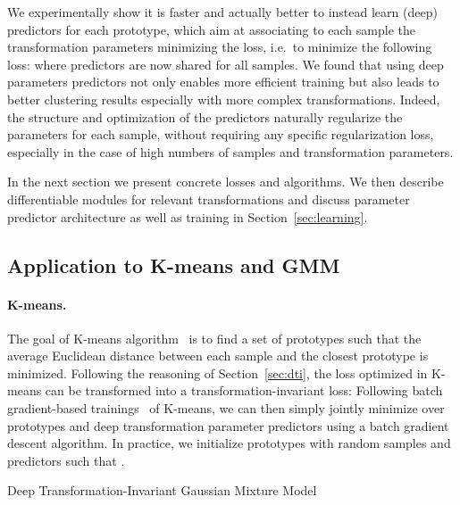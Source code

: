 \documentclass{article}
\begin{document}
\vspace{-0.3em}
We experimentally show it is faster and actually better to instead learn  (deep) 
predictors  for each prototype, which aim at associating to each sample  the 
transformation parameters  minimizing the loss, i.e.\ to minimize the following 
loss:
where predictors  are now shared for all samples. We found that using deep 
parameters predictors not only enables more efficient training but also leads to better 
clustering results especially with more complex transformations. Indeed, the structure and 
optimization of the predictors naturally regularize the parameters for each sample, without 
requiring any specific regularization loss, especially in the case of high numbers  of 
samples and transformation parameters.

\vspace{-0.3em}
In the next section we present concrete losses and algorithms. We then describe 
differentiable modules for relevant transformations and discuss parameter predictor 
architecture as well as training in Section~\ref{sec:learning}. 

\subsection{Application to K-means and GMM}

\paragraph{K-means.}
The goal of K-means algorithm~\cite{macqueenMethodsClassificationAnalysis1967} is to find a 
set of prototypes  such that the average Euclidean distance between each sample and 
the closest prototype is minimized. Following the reasoning of Section~\ref{sec:dti}, the 
loss optimized in K-means can be transformed into a transformation-invariant loss:
Following batch gradient-based trainings~\cite{bottouConvergencePropertiesKmeans1995} of 
K-means, we can then simply jointly minimize  over prototypes 
 and deep transformation parameter predictors  using a batch gradient 
descent algorithm. In practice, we initialize prototypes  with random samples and 
predictors  such that .
\begin{algorithm}[t]
  \caption{Deep Transformation-Invariant Gaussian Mixture Model}
  \setlength{\abovedisplayskip}{0pt}
  \setlength{\belowdisplayskip}{0pt}
  \label{algo:dtigmm}
\end{algorithm}
\vspace{-0.7em}
\end{document}
